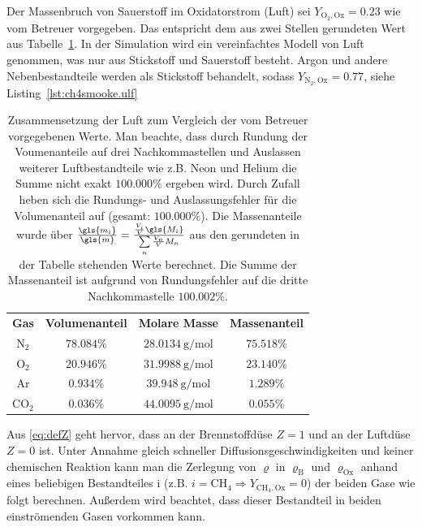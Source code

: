 \label{pg:aircomposition}
Der Massenbruch von Sauerstoff im Oxidatorstrom (Luft) sei $Y_{\mathrm{O}_2,\text{Ox}}=0.23$ wie vom Betreuer vorgegeben. Das entspricht dem aus zwei Stellen gerundeten Wert aus Tabelle~\ref{tbl:luft}. In der Simulation wird ein vereinfachtes Modell von Luft genommen, was nur aus Stickstoff und Sauerstoff besteht. Argon und andere Nebenbestandteile werden als Stickstoff behandelt, sodass $Y_{\mathrm{N}_2,\text{Ox}}=0.77$, siehe Listing~\ref{lst:ch4smooke.ulf} \\
\begin{table}[H]
    \begin{center}\begin{tabular}{cccc}
    \textbf{Gas}    & \textbf{Volumenanteil}\cite[13]{moeller2003luft}\cite{pseiupac} & \textbf{Molare Masse}\cite{nistwebbook} & \textbf{Massenanteil} \\
    $\mathrm{N}_2 $  &  $78.084\%$  &  $\SI{28.0134}{\gram\per\mole}$  &  $75.518\%$    \\
    $\mathrm{O}_2 $  &  $20.946\%$  &  $\SI{31.9988}{\gram\per\mole}$  &  $23.140\%$    \\
    $\mathrm{Ar}  $  &  $ 0.934\%$  &  $\SI{39.948 }{\gram\per\mole}$  &  $ 1.289\%$    \\
    $\mathrm{CO}_2$  &  $ 0.036\%$  &  $\SI{44.0095}{\gram\per\mole}$  &  $ 0.055\%$    \\
    \end{tabular}\end{center}
    \caption{Zusammensetzung der Luft zum Vergleich der vom Betreuer vorgegebenen Werte. Man beachte, dass durch Rundung der Voumenanteile auf drei Nachkommastellen und Auslassen weiterer Luftbestandteile wie z.B. Neon und Helium die Summe nicht exakt $100.000\%$ ergeben wird. Durch Zufall heben sich die Rundungs- und Auslassungsfehler für die Volumenanteil auf (gesamt: $100.000\%$). Die Massenanteile wurde über $\frac{\gls{m_i}}{\gls{m}} = \frac{ \frac{V_i}{V} \gls{M_i} }{ \sum\limits_n \frac{V_n}{V} M_n }$ aus den gerundeten in der Tabelle stehenden Werte berechnet. Die Summe der Massenanteil ist aufgrund von Rundungsfehler auf die dritte Nachkommastelle $100.002\%$.}
    \label{tbl:luft}
\end{table}
Aus \autoref{eq:defZ} geht hervor, dass an der Brennstoffdüse $Z=1$ und an der Luftdüse $Z=0$ ist. Unter Annahme gleich schneller Diffusionsgeschwindigkeiten und keiner chemischen Reaktion kann man die Zerlegung von $\varrho$ in $\varrho_\text{B}$ und $\varrho_\text{Ox}$ anhand eines beliebigen Bestandteiles \gls{i} (z.B. $i=\mathrm{CH}_4 \Rightarrow Y_{\mathrm{CH}_4,\text{Ox}}=0$) der beiden Gase wie folgt berechnen. Außerdem wird beachtet, dass dieser Bestandteil in beiden einströmenden Gasen vorkommen kann.
